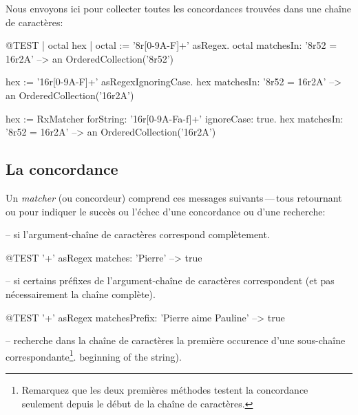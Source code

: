 \documentclass[a4paper,10pt,twoside]{book}
\begin{document}
{Nous envoyons ici  pour collecter toutes
les concordances trouvées dans une chaîne de caractères:

\begin{code}{@TEST | octal hex |}
octal := '8r[0-9A-F]+' asRegex.
octal matchesIn: '8r52 = 16r2A' --> an OrderedCollection('8r52')

hex := '16r[0-9A-F]+' asRegexIgnoringCase.
hex matchesIn: '8r52 = 16r2A'   --> an OrderedCollection('16r2A')

hex := RxMatcher forString: '16r[0-9A-Fa-f]+' ignoreCase: true.
hex matchesIn: '8r52 = 16r2A'   --> an OrderedCollection('16r2A')
\end{code}

\subsection{La concordance}

Un \emph{matcher} (ou concordeur) comprend ces messages suivants\,---\,tous
retournant  ou  pour indiquer le succès ou l'échec
d'une concordance ou d'une recherche:

  --  si l'argument-chaîne de
caractères  correspond complètement.

\begin{code}{@TEST}
'\w+' asRegex matches: 'Pierre' --> true
\end{code}

  --  si certains préfixes
de l'argument-chaîne de caractères  correspondent (et pas
nécessairement la chaîne complète).

\begin{code}{@TEST}
'\w+' asRegex matchesPrefix: 'Pierre aime Pauline' --> true
\end{code}

  -- recherche dans la chaîne de
caractères la première occurence d'une sous-chaîne
correspondante\footnote{Remarquez que les deux premières méthodes
  testent la concordance seulement depuis le début de la chaîne de caractères.}.
beginning of the string).

}
\end{document}
